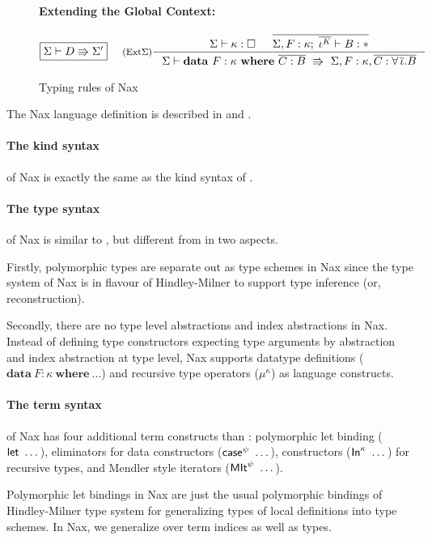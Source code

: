 \begin{figure}
\begin{framed}
\paragraph{Extending the Global Context:}
\[ \fbox{$\Sigma |- D \Rrightarrow \Sigma'$}
 ~~~~
   \inference[(Ext$\Sigma$)]
      { \Sigma |- \kappa : \square
      & \overline{\Sigma,F:\kappa;\;\overline{\iota^K} |- B:*} }
      { \Sigma |- \mathbf{data}~ F : \kappa ~ \mathbf{where} ~ \overline{C : B}
               ~\Rrightarrow~
                  \Sigma,F:\kappa,\overline{C:\forall\,\overline{\iota}.B} }
\]
\end{framed}
\caption{Typing rules of Nax}
\label{fig:NaxTyping}
\end{figure}

The Nax language definition is described in  and .

\paragraph{The kind syntax} of Nax is exactly the same as
the kind syntax of \Fi.

\paragraph{The type syntax} of Nax is similar to \Fi, but different from
\Fi in two aspects.

Firstly, polymorphic types are separate out as type schemes in Nax
since the type system of Nax is in flavour of Hindley-Milner
to support type inference (or, reconstruction).

Secondly, there are no type level abstractions and index abstractions in Nax.
Instead of defining type constructors expecting type arguments by
abstraction and index abstraction at type level, Nax supports datatype
definitions ($\mathbf{data}~F:\kappa~\mathbf{where}~\dots$) and
recursive type operators ($\mu^\kappa$) as language constructs.

\paragraph{The term syntax} of Nax has four additional term constructs than \Fi:
polymorphic let binding ($\mathsf{let}~\dots$),
eliminators for data constructors ($\mathsf{case}^\psi~\dots$),
constructors ($\mathsf{In}^\kappa~\dots$) for recursive types, and
Mendler style iterators ($\mathsf{MIt}^\psi~\dots$).

Polymorphic let bindings in Nax are just the usual polymorphic bindings of
Hindley-Milner type system for generalizing types of local definitions into
type schemes. In Nax, we generalize over term indices as well as types.

